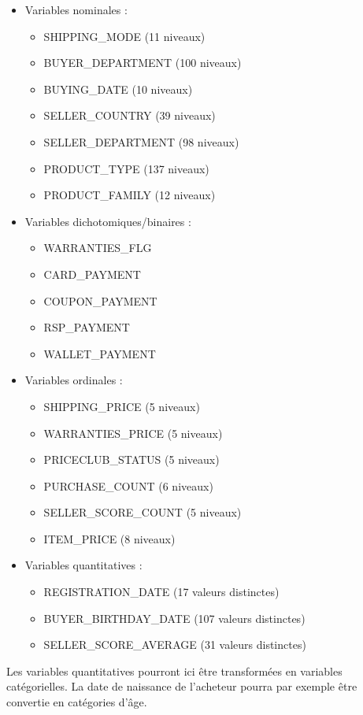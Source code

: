 \begin{itemize}
\item Variables nominales : 
	\begin{itemize}
	\item SHIPPING_MODE (11 niveaux)
	\item BUYER_DEPARTMENT (100 niveaux)
	\item BUYING_DATE (10 niveaux)
	\item SELLER_COUNTRY (39 niveaux)
	\item SELLER_DEPARTMENT (98 niveaux)
	\item PRODUCT_TYPE (137 niveaux)
	\item PRODUCT_FAMILY (12 niveaux)
	\end{itemize}
\item Variables dichotomiques/binaires :
	\begin{itemize}
	\item WARRANTIES_FLG
	\item CARD_PAYMENT
	\item COUPON_PAYMENT
	\item RSP_PAYMENT
	\item WALLET_PAYMENT
	\end{itemize}
\item Variables ordinales :
	\begin{itemize}
	\item SHIPPING_PRICE (5 niveaux)
	\item WARRANTIES_PRICE (5 niveaux)
	\item PRICECLUB_STATUS (5 niveaux)
	\item PURCHASE_COUNT (6 niveaux)
	\item SELLER_SCORE_COUNT (5 niveaux)
	\item ITEM_PRICE (8 niveaux)
	\end{itemize}
\item Variables quantitatives :
	\begin{itemize}
	\item REGISTRATION_DATE (17 valeurs distinctes)
	\item BUYER_BIRTHDAY_DATE (107 valeurs distinctes)
	\item SELLER_SCORE_AVERAGE (31 valeurs distinctes)
	\end{itemize}
\end{itemize}

Les variables quantitatives pourront ici être transformées en variables catégorielles.
La date de naissance de l'acheteur pourra par exemple être convertie en catégories d'âge.    
    
